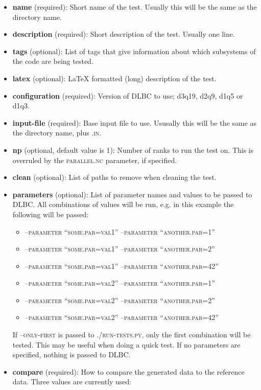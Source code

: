 \documentclass{article}
\begin{document}
\begin{itemize}
\item \textbf{name} (required): Short name of the test. Usually this will be the same as the directory name.
\item \textbf{description} (required): Short description of the test. Usually one line.
\item \textbf{tags} (optional): List of tags that give information about which subsystems of the code are being tested.
\item \textbf{latex} (optional): LaTeX formatted (long) description of the test.
\item \textbf{configuration} (required): Version of DLBC to use; d3q19, d2q9, d1q5 or d1q3.
\item \textbf{input-file} (required): Base input file to use. Ususally this will be the same as the directory name, plus \textsc{.in}.
\item \textbf{np} (optional, default value is 1): Number of ranks to run the test on. This is overruled by the \textsc{parallel.nc} parameter, if specified.
\item \textbf{clean} (optional): List of paths to remove when cleaning the test.
\item \textbf{parameters} (optional): List of parameter names and values to be passed to DLBC. All combinations of values will be run, e.g. in this example the following will be passed:
\begin{itemize}
\item \textsc{--parameter ``some.par=val1'' --parameter ``another.par=1''}
\item \textsc{--parameter ``some.par=val1'' --parameter ``another.par=2''}
\item \textsc{--parameter ``some.par=val1'' --parameter ``another.par=42''}
\item \textsc{--parameter ``some.par=val2'' --parameter ``another.par=1''}
\item \textsc{--parameter ``some.par=val2'' --parameter ``another.par=2''}
\item \textsc{--parameter ``some.par=val2'' --parameter ``another.par=42''}
\end{itemize}
If \textsc{--only-first} is passed to \textsc{./run-tests.py}, only the first combination will be tested. This may be useful when doing a quick test. If no parameters are specified, nothing is passed to DLBC.
\item \textbf{compare} (required): How to compare the generated data to the reference data. Three values are currently used:

\end{itemize}
\end{document}
